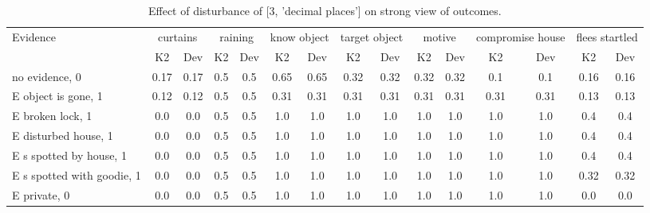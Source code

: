 \begin{table}\begin{tabular}{l|cc|cc|cc|cc|cc|cc|cc}\toprule\multirow{2}{*}{Evidence} & \multicolumn{2}{c}{curtains}& \multicolumn{2}{c}{raining}& \multicolumn{2}{c}{know object}& \multicolumn{2}{c}{target object}& \multicolumn{2}{c}{motive}& \multicolumn{2}{c}{compromise house}& \multicolumn{2}{c}{flees startled}\\& {K2} & {Dev}& {K2} & {Dev}& {K2} & {Dev}& {K2} & {Dev}& {K2} & {Dev}& {K2} & {Dev}& {K2} & {Dev}\\\midrule
no evidence, 0 & 0.17&0.17&0.5&0.5&0.65&0.65&0.32&0.32&0.32&0.32&0.1&0.1&0.16&0.16\\E object is gone, 1 & 0.12&0.12&0.5&0.5&0.31&0.31&0.31&0.31&0.31&0.31&0.31&0.31&0.13&0.13\\E broken lock, 1 & 0.0&0.0&0.5&0.5&1.0&1.0&1.0&1.0&1.0&1.0&1.0&1.0&0.4&0.4\\E disturbed house, 1 & 0.0&0.0&0.5&0.5&1.0&1.0&1.0&1.0&1.0&1.0&1.0&1.0&0.4&0.4\\E s spotted by house, 1 & 0.0&0.0&0.5&0.5&1.0&1.0&1.0&1.0&1.0&1.0&1.0&1.0&0.4&0.4\\E s spotted with goodie, 1 & 0.0&0.0&0.5&0.5&1.0&1.0&1.0&1.0&1.0&1.0&1.0&1.0&0.32&0.32\\E private, 0 & 0.0&0.0&0.5&0.5&1.0&1.0&1.0&1.0&1.0&1.0&1.0&1.0&0.0&0.0\\\bottomrule\end{tabular}\caption{Effect of disturbance of [3, 'decimal places'] on strong view of outcomes.}\end{table}
